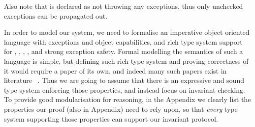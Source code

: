 \noindent Also note that \Q@invariant@ is declared as not throwing any exceptions,
	thus only unchecked exceptions can be propagated out.



In order to model our system, we need to formalise an imperative object oriented language
with exceptions and object capabilities,  and rich type system
support for \Q@mut@, \Q@imm@, \Q@read@, \Q@capsule@, and strong exception safety.
Formal modelling the semantics of such a language is simple, but 
defining such rich type system and proving correctness of it would require a paper
of its own, and indeed many such papers exist in literature%
~\cite{ServettoEtAl13a,ServettoZucca15,GordonEtAl12,clebsch2015deny,JOT:issue_2011_01/article1}.
Thus we are going to assume that there is an expressive and sound type system enforcing
those properties, and instead focus on invariant checking.
To provide good modularisation for reasoning, in the Appendix
we clearly list the properties our proof (also in Appendix) need to rely upon, so that \emph{every} type
system supporting those properties can support our invariant protocol.

